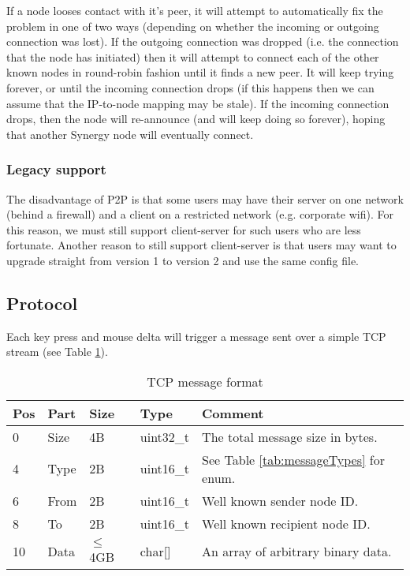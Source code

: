 If a node looses contact with it's peer, it will attempt to automatically fix
the problem in one of two ways (depending on whether the incoming or outgoing 
connection was lost). If the outgoing connection was dropped (i.e. the 
connection that the node has initiated) then it will attempt to connect each 
of the other known nodes in round-robin fashion until it finds a new peer. It 
will keep trying forever, or until the incoming connection drops (if this 
happens then we can assume that the IP-to-node mapping may be stale). If
the incoming connection drops, then the node will re-announce (and will keep
doing so forever), hoping that another Synergy node will eventually connect.

\subsubsection{Legacy support}

The disadvantage of P2P is that some users may have their server on one network
(behind a firewall) and a client on a restricted network (e.g. corporate wifi).
For this reason, we must still support client-server for such users who are 
less fortunate. Another reason to still support client-server is that users may
want to upgrade straight from version 1 to version 2 and use the same config 
file.

\subsection{Protocol}

Each key press and mouse delta will trigger a message sent over a simple TCP 
stream (see Table \ref{tab:messageFormat}).

\begin{table}[ht!]
  \begin{tabular}{|l|l|l|l|l|}
    \hline
    \textbf{Pos} &
    \textbf{Part} &
    \textbf{Size} &
    \textbf{Type} &
    \textbf{Comment} \\
    \hline
    0 & Size & 4B & uint32\_t & The total message size in bytes. \\
    4 & Type & 2B & uint16\_t & See Table \ref{tab:messageTypes} for enum. \\
    6 & From & 2B & uint16\_t & Well known sender node ID. \\
    8 & To & 2B & uint16\_t & Well known recipient node ID. \\
    10 & Data & $\leq$4GB & char[] & An array of arbitrary binary data. \\
    \hline
  \end{tabular}
  \caption{TCP message format}
  \label{tab:messageFormat}
\end{table}

